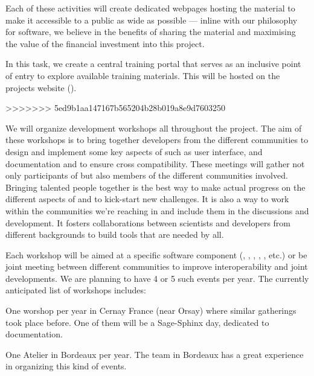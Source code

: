 \begin{workpackage}
\begin{tasklist}
\begin{task}[title=Training and training portal,
id=training-portal,lead=PS,PM=1,wphases=0-1]
Each of these activities will create dedicated webpages hosting the
material to make it accessible to a public as wide as possible ---
inline with our philosophy for software, we believe in the benefits of
sharing the material and maximising the value of the financial
investment into this project.

In this task, we create a central \TheProject training portal that
serves as an inclusive point of entry to explore available training
materials. This will be hosted on the projects website ().
\end{task}


\begin{task}[title=Community building: development workshops, lead=PS,PM=12, partners={UB,UK,UJF,SR,SA,UW}, id=devel-workshops]
>>>>>>> 5ed9b1aa147167b565204b28b019a8e9d7603250


  We will organize development workshops all throughout the
  project. The aim of these workshops is to bring together developers
  from the different communities to design and implement some key
  aspects of \TheProject such as user interface, and documentation and
  to ensure cross compatibility. These meetings will gather not only
  participants of \TheProject but also members of the different
  communities involved. Bringing talented people together is the best
  way to make actual progress on the different aspects of \TheProject
  and to kick-start new challenges. It is also a way to work within
  the communities we're reaching in and include them in the discussions
  and development. It fosters collaborations between scientists and
  developers from different backgrounds to build tools that are needed
  by all.

  Each workshop will be aimed at a specific software component (\Sage,
  \GAP, \SMC, \IPython, \Singular, etc.) or be joint meeting between
  different communities to improve interoperability and joint
  developments. We are planning to have 4 or 5 such events per
  year. The currently anticipated list of workshops includes:

\begin{compactitem}
\item One \Sage worshop per year in Cernay France (near Orsay) where
  similar gatherings took place before. One of them will be a
  Sage-Sphinx day, dedicated to documentation.

\item One Atelier \Pari in Bordeaux per year. The team in Bordeaux has
  a great experience in organizing this kind of \Pari events.


\end{compactitem}
\end{task}
\end{tasklist}
\end{workpackage}
